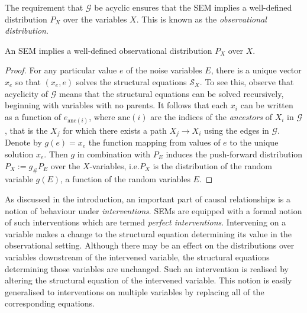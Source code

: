The requirement that $\mathcal{G}$ be acyclic ensures that the SEM implies a well-defined distribution $P_X$ over the variables $X$. This is known as the \emph{observational distribution}.

\medskip

\begin{lemma}\label{lemma:acyclic-sem-well-defined-obs-dist}
An SEM implies a well-defined observational distribution $P_X$ over $X$.
\end{lemma}

\begin{proof}
For any particular value $e$ of the noise variables $E$, there is a unique vector $x_e$ so that $(x_e, e)$ solves the structural equations $\mathcal{S}_X$. To see this, observe that acyclicity of $\mathcal{G}$ means that the structural equations can be solved recursively, beginning with variables with no parents. It follows that each $x_i$ can be written as a function of $e_{\text{anc}(i)}$, where $\text{anc}(i)$ are the indices of the \emph{ancestors} of $X_i$ in $\mathcal{G}$, that is the $X_j$ for which there exists a path $X_j \to X_i$ using the edges in $\mathcal{G}$. 
Denote by $g(e) = x_e$ the function mapping from values of $e$ to the unique solution $x_e$.
Then $g$ in combination with $P_E$ induces the push-forward distribution $P_X := g_\# P_E$ over the $X$-variables, i.e.\:$P_X$ is the distribution of the random variable $g(E)$, a function of the random variables $E$.
\end{proof}

As discussed in the introduction, an important part of causal relationships is a notion of behaviour under \emph{interventions}. 
SEMs are equipped with a formal notion of such interventions which are termed \emph{perfect interventions}. 
Intervening on a variable makes a change to the structural equation determining its value in the observational setting.
Although there may be an effect on the distributions over variables downstream of the intervened variable, the structural equations determining those variables are unchanged. 
Such an intervention is realised by altering the structural equation of the intervened variable. This notion is easily generalised to interventions on multiple variables by replacing all of the corresponding equations. 

